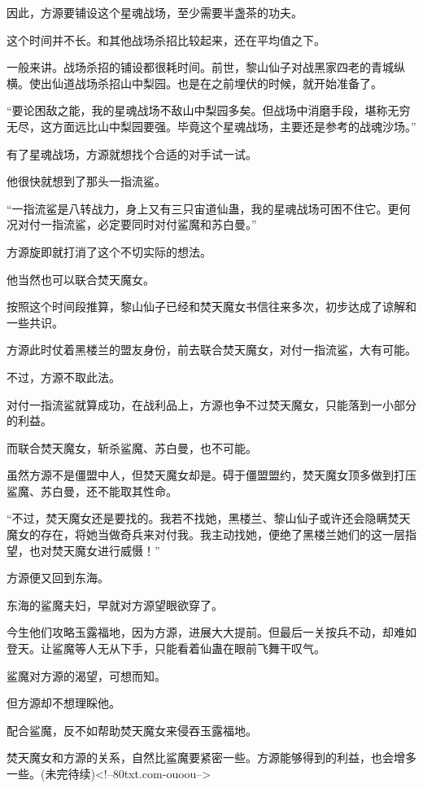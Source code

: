 \begin{this_body}
因此，方源要铺设这个星魂战场，至少需要半盏茶的功夫。

这个时间并不长。和其他战场杀招比较起来，还在平均值之下。

一般来讲。战场杀招的铺设都很耗时间。前世，黎山仙子对战黑家四老的青城纵横。使出仙道战场杀招山中梨园。也是在之前埋伏的时候，就开始准备了。

“要论困敌之能，我的星魂战场不敌山中梨园多矣。但战场中消磨手段，堪称无穷无尽，这方面远比山中梨园要强。毕竟这个星魂战场，主要还是参考的战魂沙场。”

有了星魂战场，方源就想找个合适的对手试一试。

他很快就想到了那头一指流鲨。

“一指流鲨是八转战力，身上又有三只宙道仙蛊，我的星魂战场可困不住它。更何况对付一指流鲨，必定要同时对付鲨魔和苏白曼。”

方源旋即就打消了这个不切实际的想法。

他当然也可以联合焚天魔女。

按照这个时间段推算，黎山仙子已经和焚天魔女书信往来多次，初步达成了谅解和一些共识。

方源此时仗着黑楼兰的盟友身份，前去联合焚天魔女，对付一指流鲨，大有可能。

不过，方源不取此法。

对付一指流鲨就算成功，在战利品上，方源也争不过焚天魔女，只能落到一小部分的利益。

而联合焚天魔女，斩杀鲨魔、苏白曼，也不可能。

虽然方源不是僵盟中人，但焚天魔女却是。碍于僵盟盟约，焚天魔女顶多做到打压鲨魔、苏白曼，还不能取其性命。

“不过，焚天魔女还是要找的。我若不找她，黑楼兰、黎山仙子或许还会隐瞒焚天魔女的存在，将她当做奇兵来对付我。我主动找她，便绝了黑楼兰她们的这一层指望，也对焚天魔女进行威慑！”

方源便又回到东海。

东海的鲨魔夫妇，早就对方源望眼欲穿了。

今生他们攻略玉露福地，因为方源，进展大大提前。但最后一关按兵不动，却难如登天。让鲨魔等人无从下手，只能看着仙蛊在眼前飞舞干叹气。

鲨魔对方源的渴望，可想而知。

但方源却不想理睬他。

配合鲨魔，反不如帮助焚天魔女来侵吞玉露福地。

焚天魔女和方源的关系，自然比鲨魔要紧密一些。方源能够得到的利益，也会增多一些。(未完待续)<!--80txt.com-ouoou-->

\end{this_body}

